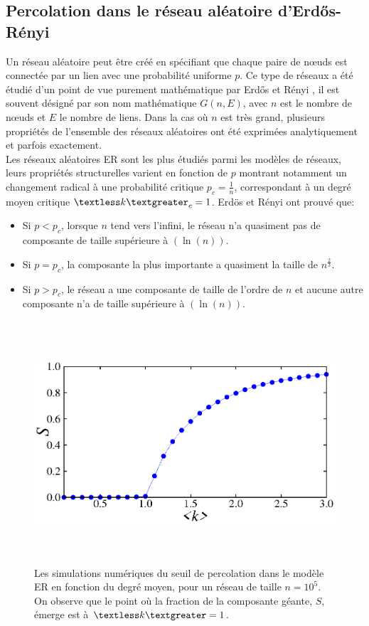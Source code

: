 \subsection{Percolation dans le réseau aléatoire d'Erd\H{o}s-Rényi}
Un réseau aléatoire peut être créé en spécifiant que chaque paire de nœuds est connectée par un lien avec une probabilité uniforme $p$. Ce type de réseaux a été étudié d'un point de vue purement mathématique par Erd\H{o}s et Rényi \cite{Erdos-Renyi1959,Erdos-Renyi1960,Erdos-Renyi1961}, il est souvent désigné par son nom mathématique $G(n,E)$, avec $n$ est le nombre de nœuds et $E$ le nombre de liens. 
Dans la cas où $n$ est très grand, plusieurs propriétés de l'ensemble des réseaux aléatoires ont été exprimées analytiquement et parfois exactement.\\
Les réseaux aléatoires ER sont les plus étudiés parmi les modèles de réseaux, leurs propriétés structurelles varient en fonction de $p$ montrant notamment un changement radical à une probabilité critique $p_c=\frac{1}{n}$,
correspondant à un degré moyen critique $\textless k \textgreater_c=1$. Erdös et Rényi ont prouvé que:\\
\begin{itemize}
	\item Si $p <p_c$, lorsque $n$ tend vers l'infini, le réseau n'a quasiment pas de composante de taille  
	supérieure à $(\ln(n))$.
	\item Si $p=p_c$, la composante la plus importante a quasiment la taille de $n^{\frac{2}{3}}$.
	\item Si $p> p_c$, le réseau a une composante de taille de l'ordre de $n$ et aucune autre composante n'a de taille supérieure à $(\ln(n))$.
\end{itemize}
\begin{figure}[h!]
	\centering
	\includegraphics[width=12cm,height=9cm]{./figures/fig-ER-CG}
	\caption{Les simulations numériques du seuil de percolation dans le modèle ER en fonction du degré moyen, pour un réseau de taille $n=10^5$. On observe que le point où la fraction de la composante géante, $S$, émerge est à $\textless k\textgreater=1$.}
	
	\label{percolation-graph}
\end{figure}

